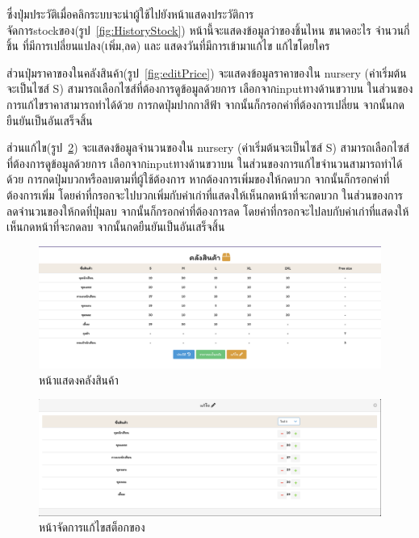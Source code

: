 \begin{itemize}
  ซึ่งปุ่มประวัติเมื่อคลิกระบบจะนำผู้ใช้ไปยังหน้าแสดงประวัติการจัดการstockของ(รูป~\ref{fig:HistoryStock}) หน้านี้จะแสดงข้อมูลว่าของชิ้นไหน ขนาดอะไร จำนวนกี่ชิ้น ที่มีการเปลี่ยนแปลง(เพิ่ม,ลด) และ แสดงวันที่มีการเข้ามาแก้ไข แก้ไขโดยใคร
  
  ส่วนปุ่มราคาของในคลังสินค้า(รูป~\ref{fig:editPrice}) จะแสดงข้อมูลราคาของใน nursery (ค่าเริ่มต้นจะเป็นไซส์ S) สามารถเลือกไซส์ที่ต้องการดูข้อมูลด้วยการ เลือกจากinputทางด้านขวาบน ในส่วนของการแก้ไขราคาสามารถทำได้ด้วย การกดปุ่มปากกาสีฟ้า จากนั้นก็กรอกค่าที่ต้องการเปลี่ยน
  จากนั้นกดยืนยันเป็นอันเสร็จสิ้น
  
  ส่วนแก้ไข(รูป~\ref{fig:CheckStock}) จะแสดงข้อมูลจำนวนของใน nursery (ค่าเริ่มต้นจะเป็นไซส์ S) สามารถเลือกไซส์ที่ต้องการดูข้อมูลด้วยการ เลือกจากinputทางด้านขวาบน ในส่วนของการแก้ไขจำนวนสามารถทำได้ด้วย การกดปุ่มบวกหรือลบตามที่ผู้ใช้ต้องการ หากต้องการเพิ่มของให้กดบวก จากนั้นก็กรอกค่าที่ต้องการเพิ่ม
  โดยค่าที่กรอกจะไปบวกเพิ่มกับค่าเก่าที่แสดงให้เห็นกดหน้าที่จะกดบวก ในส่วนของการลดจำนวนของให้กดที่ปุ่มลบ จากนั้นก็กรอกค่าที่ต้องการลด โดยค่าที่กรอกจะไปลบกับค่าเก่าที่แสดงให้เห็นกดหน้าที่จะกดลบ จากนั้นกดยืนยันเป็นอันเสร็จสิ้น

  
    \begin{figure}
      \begin{center}
      \includegraphics[width=\linewidth]{images/Stock.png}
      \end{center}
      \caption[หน้าแสดงคลังสินค้า]{หน้าแสดงคลังสินค้า}
      \label{fig:Stock}
      \end{figure}
  
  
    \begin{figure}
      \begin{center}
      \includegraphics[width=\linewidth]{images/handleStock.png}
      \end{center}
      \caption[หน้าจัดการแก้ไขสต็อกของ]{หน้าจัดการแก้ไขสต็อกของ}
      \label{fig:CheckStock}
      \end{figure}
  

\end{itemize}
